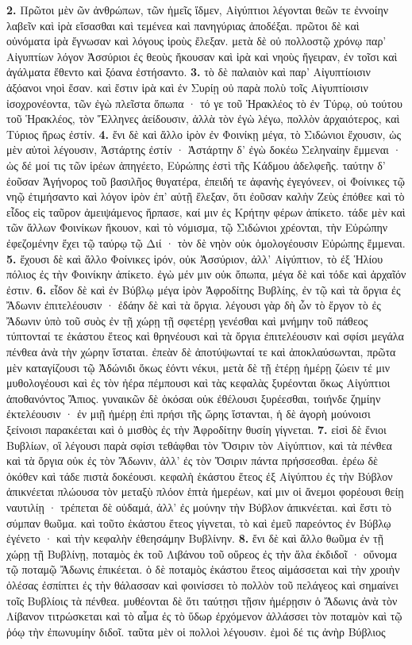 \documentclass[a4paper, 11pt, oneside, polutonikogreek, german]{article}
\begin{document}
\textbf{2.} Πρῶτοι μὲν ῶν ἀνθρώπων, τῶν ἡμεῖς ἴδμεν, Αἰγύπτιοι λέγονται θεῶν τε ἐννοίην λαβεῖν καὶ ἱρὰ εἴσασθαι καὶ τεμένεα καὶ πανηγύριας ἀποδέξαι. πρῶτοι δὲ καὶ οὐνόματα ἱρὰ ἔγνωσαν καὶ λόγους ἱροὺς ἔλεξαν. μετὰ δὲ οὐ πολλοστῷ χρόνῳ παρ' Αἰγυπτίων λόγον Ἀσσύριοι ἐς θεοὺς ἤκουσαν καὶ ἱρὰ καὶ νηοὺς ἤγειραν, ἐν τοῖσι καὶ ἀγάλματα ἔθεντο καὶ ξόανα ἐστήσαντο. \textbf{3.} τὸ δὲ παλαιὸν καὶ παρ' Αἰγυπτίοισιν ἀξόανοι νηοὶ ἔσαν. καὶ ἔστιν ἱρὰ καὶ ἐν Συρίῃ οὐ παρὰ πολὺ τοῖς Αἰγυπτίοισιν ἰσοχρονέοντα, τῶν ἐγὼ πλεῖστα ὄπωπα · τό γε τοῦ Ἡρακλέος τὸ ἐν Τύρῳ, οὐ τούτου τοῦ Ἡρακλέος, τὸν Ἕλληνες ἀείδουσιν, ἀλλὰ τὸν ἐγὼ λέγω, πολλὸν ἀρχαιότερος, καὶ Τύριος ἥρως ἐστίν. \textbf{4.} ἔνι δὲ καὶ ἄλλο ἱρὸν ἐν Φοινίκῃ μέγα, τὸ Σιδώνιοι ἔχουσιν, ὡς μὲν αὐτοὶ λέγουσιν, Ἀστάρτης ἐστίν · Ἀστάρτην δ' ἐγὼ δοκέω Σεληναίην ἔμμεναι · ὡς δέ μοί τις τῶν ἱρέων ἀπηγέετο, Εὐρώπης ἐστὶ τῆς Κάδμου ἀδελφεῆς. ταύτην δ' ἐοῦσαν Ἀγήνορος τοῦ βασιλῆος θυγατέρα, ἐπειδή τε ἀφανὴς ἐγεγόνεεν, οἱ Φοίνικες τῷ νηῷ ἐτιμήσαντο καὶ λόγον ἱρὸν ἐπ' αὐτῇ ἔλεξαν, ὅτι ἐοῦσαν καλὴν Ζεὺς ἐπόθεε καὶ τὸ εἶδος εἰς ταῦρον ἀμειψάμενος ἥρπασε, καί μιν ἐς Κρήτην φέρων ἀπίκετο. τάδε μὲν καὶ τῶν ἄλλων Φοινίκων ἤκουον, καὶ τὸ νόμισμα, τῷ Σιδώνιοι χρέονται, τὴν Εὐρώπην ἐφεζομένην ἔχει τῷ ταύρῳ τῷ Διί · τὸν δὲ νηὸν οὐκ ὁμολογέουσιν Εὐρώπης ἔμμεναι. \textbf{5.} ἔχουσι δὲ καὶ ἄλλο Φοίνικες ἱρόν, οὐκ Ἀσσύριον, ἀλλ' Αἰγύπτιον, τὸ ἐξ Ἡλίου πόλιος ἐς τὴν Φοινίκην ἀπίκετο. ἐγὼ μέν μιν οὐκ ὄπωπα, μέγα δὲ καὶ τόδε καὶ ἀρχαῖόν ἐστιν. \textbf{6.} εἶδον δὲ καὶ ἐν Βύβλῳ μέγα ἱρὸν Ἀφροδίτης Βυβλίης, ἐν τῷ καὶ τὰ ὄργια ἐς Ἄδωνιν ἐπιτελέουσιν · ἐδάην δὲ καὶ τὰ ὄργια. λέγουσι γὰρ δὴ ὦν τὸ ἔργον τὸ ἐς Ἄδωνιν ὑπὸ τοῦ συὸς ἐν τῇ χώρῃ τῇ σφετέρῃ γενέσθαι καὶ μνήμην τοῦ πάθεος τύπτονταί τε ἑκάστου ἔτεος καὶ θρηνέουσι καὶ τὰ ὄργια ἐπιτελέουσιν καὶ σφίσι μεγάλα πένθεα ἀνὰ τὴν χώρην ἵσταται. ἐπεὰν δὲ ἀποτύψωνταί τε καὶ ἀποκλαύσωνται, πρῶτα μὲν καταγίζουσι τῷ Ἀδώνιδι ὅκως ἐόντι νέκυι, μετὰ δὲ τῇ ἑτέρῃ ἡμέρῃ ζώειν τέ μιν μυθολογέουσι καὶ ἐς τὸν ἠέρα πέμπουσι καὶ τὰς κεφαλὰς ξυρέονται ὅκως Αἰγύπτιοι ἀποθανόντος Ἄπιος. γυναικῶν δὲ ὁκόσαι οὐκ ἐθέλουσι ξυρέεσθαι, τοιήνδε ζημίην ἐκτελέουσιν · ἐν μιῇ ἡμέρῃ ἐπὶ πρήσι τῆς ὥρης ἵστανται, ἡ δὲ ἀγορὴ μούνοισι ξείνοισι παρακέεται καὶ ὁ μισθὸς ἐς τὴν Ἀφροδίτην θυσίη γίγνεται. \textbf{7.} εἰσὶ δὲ ἔνιοι Βυβλίων, οἳ λέγουσι παρὰ σφίσι τεθάφθαι τὸν Ὄσιριν τὸν Αἰγύπτιον, καὶ τὰ πένθεα καὶ τὰ ὄργια οὐκ ἐς τὸν Ἄδωνιν, ἀλλ' ἐς τὸν Ὄσιριν πάντα πρήσσεσθαι. ἐρέω δὲ ὁκόθεν καὶ τάδε πιστὰ δοκέουσι. κεφαλὴ ἑκάστου ἔτεος ἐξ Αἰγύπτου ἐς τὴν Βύβλον ἀπικνέεται πλώουσα τὸν μεταξὺ πλόον ἑπτὰ ἡμερέων, καί μιν οἱ ἄνεμοι φορέουσι θείῃ ναυτιλίῃ · τρέπεται δὲ οὐδαμά, ἀλλ' ἐς μούνην τὴν Βύβλον ἀπικνέεται. καὶ ἔστι τὸ σύμπαν θωῦμα. καὶ τοῦτο ἑκάστου ἔτεος γίγνεται, τὸ καὶ ἐμεῦ παρεόντος ἐν Βύβλῳ ἐγένετο · καὶ τὴν κεφαλὴν ἐθεησάμην Βυβλίνην. \textbf{8.} ἔνι δὲ καὶ ἄλλο θωῦμα ἐν τῇ χώρῃ τῇ Βυβλίνῃ, ποταμὸς ἐκ τοῦ Λιβάνου τοῦ οὔρεος ἐς τὴν ἅλα ἐκδιδοῖ · οὔνομα τῷ ποταμῷ Ἄδωνις ἐπικέεται. ὁ δὲ ποταμὸς ἑκάστου ἔτεος αἱμάσσεται καὶ τὴν χροιὴν ὀλέσας ἐσπίπτει ἐς τὴν θάλασσαν καὶ φοινίσσει τὸ πολλὸν τοῦ πελάγεος καὶ σημαίνει τοῖς Βυβλίοις τὰ πένθεα. μυθέονται δὲ ὅτι ταύτῃσι τῇσιν ἡμέρῃσιν ὁ Ἄδωνις ἀνὰ τὸν Λίβανον τιτρώσκεται καὶ τὸ αἷμα ἐς τὸ ὕδωρ ἐρχόμενον ἀλλάσσει τὸν ποταμὸν καὶ τῷ ῥόῳ τὴν ἐπωνυμίην διδοῖ. ταῦτα μὲν οἱ πολλοὶ λέγουσιν. ἐμοὶ δέ τις ἀνὴρ Βύβλιος 
\end{document}
